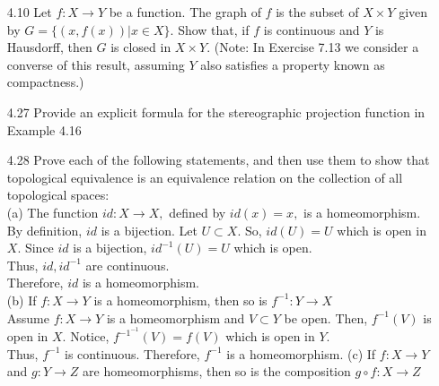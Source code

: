 \documentclass[12pt]{article}
\newcommand{\1}{^{-1}}
\begin{document}
\begin{enumerate}
	\item[4.10] Let $f: X \rightarrow Y$ be a function. The graph of $f$ is the subset of $X \times Y$ given by $G=\{(x, f(x)) | x \in X\} .$ Show that, if $f$ is continuous and $Y$ is Hausdorff, then $G$ is closed in $X \times Y$. (Note: In Exercise 7.13 we consider a converse of this result, assuming $Y$ also satisfies a property known as compactness.)\\
	
	\item[4.27] Provide an explicit formula for the stereographic projection function in Example 4.16\\
	
	\item[4.28] Prove each of the following statements, and then use them to show that topological equivalence is an equivalence relation on the collection of all topological spaces:\\
	(a) The function $i d: X \rightarrow X,$ defined by $i d(x)=x,$ is a homeomorphism.\\
	By definition, $ id $ is a bijection. Let $ U\subset X $. So, $ id(U)=U $ which is open in $ X $. Since $ id $ is a bijection, $ id\1(U)=U $ which is open. \\
	Thus, $ id,id\1 $ are continuous.\\
	Therefore, $id $ is a homeomorphism.\\
	(b) If $f: X \rightarrow Y$ is a homeomorphism, then so is $f^{-1}: Y \rightarrow X$\\
	Assume $ f: X\to Y$ is a homeomorphism and $ V\subset Y $ be open. Then, $ f\1(V) $ is open in $ X $. Notice, $ f^{-1^{-1}}(V)=f(V) $ which is open in $ Y $.\\
	Thus, $ f\1 $ is continuous.
	Therefore, $ f\1 $ is a homeomorphism.
	(c) If $f: X \rightarrow Y$ and $g: Y \rightarrow Z$ are homeomorphisms, then so is the composition $g \circ f: X \rightarrow Z$\\
	

\end{enumerate}
\end{document}
